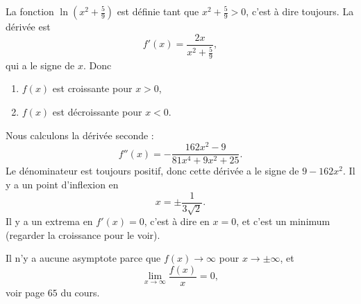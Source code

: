 \begin{corrige}{4}

La fonction  $\ln(x^2+\frac{ 5 }{ 9 })$ est définie tant que $x^2+\frac{ 5 }{ 9 }>0$, c'est à dire toujours. La dérivée est
\begin{equation}
	f'(x)=\frac{ 2x }{ x^2+\frac{ 5 }{ 9 } },
\end{equation}
qui a le signe de $x$. Donc
\begin{enumerate}

\item $f(x)$ est croissante pour $x>0$,
\item $f(x)$ est décroissante pour $x<0$.
\end{enumerate}

Nous calculons la dérivée seconde :
\begin{equation}
	f''(x)=-\frac{ 162 x^2 -9}{ 81x^4+9x^2+25 }.
\end{equation}
Le dénominateur est toujours positif, donc cette dérivée a le signe de $9-162 x^2$. Il y a un point d'inflexion en
\begin{equation}
	x=\pm\frac{ 1 }{ 3\sqrt{2} }.
\end{equation}
Il y a un extrema en $f'(x)=0$, c'est à dire en $x=0$, et c'est un minimum (regarder la croissance pour le voir).

Il n'y a aucune asymptote parce que $f(x)\to \infty$ pour $x\to\pm\infty$, et 
\begin{equation}
	\lim_{x\to\infty}\frac{ f(x) }{ x }=0,
\end{equation}
voir page $65$ du cours.

%

\end{corrige}
